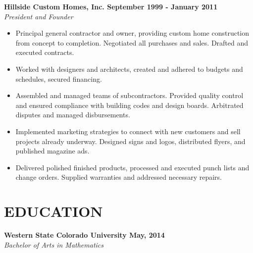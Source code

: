 \documentclass[margin,10pt]{res} %
\begin{document}
\begin{resume}
\textbf{Hillside Custom Homes, Inc. \hfill September 1999 - January 2011} \\
{\sl President and Founder} \\
\begin{itemize} %
\item Principal general contractor and owner, providing custom home construction from concept to completion. Negotiated all purchases and sales. Drafted and executed contracts.
\item Worked with designers and architects, created and adhered to budgets and schedules, secured financing. 
\item Assembled and managed teams of subcontractors. Provided quality control and ensured compliance with building codes and design boards. Arbitrated disputes and managed disbursements. 
\item Implemented marketing strategies to connect with new customers and sell projects already underway. Designed signs and logos, distributed flyers, and published magazine ads.
\item Delivered polished finished products, processed and executed punch lists and change orders. Supplied warranties and addressed necessary repairs.
\end{itemize}




\section{EDUCATION
\newline
\newline
}
\textbf{Western State Colorado University \hfill May, 2014 }  \\
{\sl Bachelor of Arts in Mathematics}










\end{resume}
\end{document}
